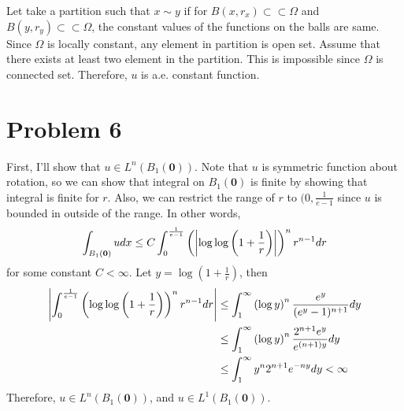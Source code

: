 \documentclass{article}
\begin{document}
Let take a partition such that $x\sim y$ if for $B(x,r_x)\subset\subset \Omega$ and $B(y, r_y)\subset\subset \Omega$, the constant values of the functions on the balls are same. Since $\Omega$ is locally constant, any element in partition is open set. Assume that there exists at least two element in the partition. This is impossible since $\Omega$ is connected set. Therefore, $u$ is a.e. constant function.
\section*{Problem 6}
First, I'll show that $u\in L^n(B_1(\bm{0}))$. Note that $u$ is symmetric function about rotation, so we can show that integral on $B_1(\bm{0})$ is finite by showing that integral is finite for $r$. Also, we can restrict the range of $r$ to $(0, \frac{1}{e-1}$ since $u$ is bounded in outside of the range. In other words,
\begin{equation*}
\int_{B_1(\bm{0})}udx\leq C\int_0^{\frac{1}{e-1}} \left(\abs{\log\log\left(1+\frac{1}{r}\right)}\right)^{n}r^{n-1}dr
\end{equation*}
for some constant $C<\infty$. Let $y=\log\left(1+\frac{1}{r}\right)$, then
\begin{equation*}
\begin{split}
\abs{\int_0^{\frac{1}{e-1}} \left(\log\log\left(1+\frac{1}{r}\right)\right)^{n}r^{n-1}dr}&\leq\int_{1}^\infty \left(\log y\right)^n \frac{e^y}{(e^y-1)^{n+1}} dy \\
&\leq \int_{1}^\infty\left(\log y\right)^n \frac{2^{n+1}e^y}{e^{(n+1)y}}dy \\
&\leq \int_{1}^\infty y^n 2^{n+1}e^{-ny}dy<\infty
\end{split}
\end{equation*}
Therefore, $u\in L^n(B_1(\bm{0}))$, and $u\in L^1(B_1(\bm{0}))$.
\end{document}
